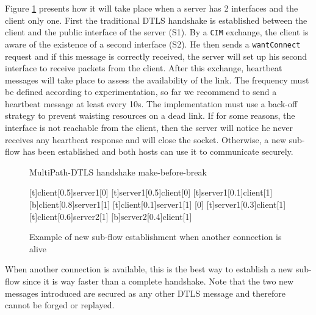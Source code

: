 Figure \ref{fig:Handshake1} presents how it will take place when a server has 2 interfaces and the client only one. First the traditional DTLS handshake is established between the client and the public interface of the server (S1). By a \texttt{CIM} exchange, the client is aware of the existence of a second interface (S2). He then sends a \texttt{wantConnect} request and if this message is correctly received, the server will set up his second interface to receive packets from the client. After this exchange, heartbeat messages will take place to assess the availability of the link. The frequency must be defined according to experimentation, so far we recommend to send a heartbeat message at least every 10s. The implementation must use a back-off strategy to prevent waisting resources on a dead link. If for some reasons, the interface is not reachable from the client, then the server will notice he never receives any heartbeat response and will close the socket. Otherwise, a new sub-flow has been established and both hosts can use it to communicate securely. 


\begin{figure}[!h]
\centering
\begin{msc}[r]{MultiPath-DTLS handshake make-before-break}

\setlength{\instfootheight}{0em}
\setlength{\instheadheight}{0em}
\setlength{\instdist}{0.33\linewidth}
\setlength{\levelheight}{3em}


[t]{client}[0.5]{server1}[0]
\nextlevel
{}[t]{server1}[0.5]{client}[0]
\nextlevel
{}[t]{server1}[0.1]{client}[1]
\nextlevel
{}[b]{client}[0.8]{server1}[1]
\nextlevel[2]
[t]{client}[0.1]{server1}[1]
\nextlevel
{}
[0]
[t]{server1}[0.3]{client}[1]
\nextlevel
{}
\nextlevel
{}[t]{client}[0.6]{server2}[1]
\nextlevel
{}[b]{server2}[0.4]{client}[1]
\nextlevel[2]

\end{msc}
\caption{Example of new sub-flow establishment when another connection is alive}
\label{fig:Handshake1}
\end{figure}

When another connection is available, this is the best way to establish a new sub-flow since it is way faster than a complete handshake. Note that the two new messages introduced are secured as any other DTLS message and therefore cannot be forged or replayed.


